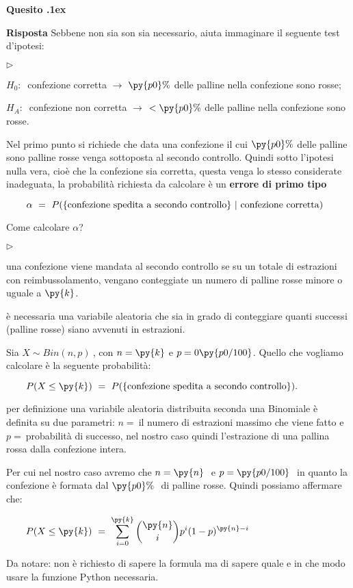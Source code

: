 \documentclass[11pt,twoside,a4paper]{article}
\newcommand{\mylabel}[1]{#1\hfill}
\renewenvironment{itemize}
  {\begin{list}{$\triangleright$}{%
   \setlength{\parskip}{0mm}
   \setlength{\topsep}{.4\baselineskip}
   \setlength{\rightmargin}{0mm}
   \setlength{\listparindent}{0mm}
   \setlength{\itemindent}{0mm}
   \setlength{\labelwidth}{2ex}
   \setlength{\itemsep}{.4\baselineskip}
   \setlength{\parsep}{0mm}
   \setlength{\partopsep}{0mm}
   \setlength{\labelsep}{1ex}
   \setlength{\leftmargin}{\labelwidth+\labelsep}
   \let\makelabel\mylabel}}{%
   \end{list}\vspace*{-1.3mm}}
\newcounter{quesito}
\newenvironment{question}{\addtocounter{quesito}{1}\par\textbf{Quesito \thequesito.\kern1ex}}{\vspace{0.5\parskip}}
\newenvironment{answer}{\par\textbf{Risposta\quad}}{\vspace{\parskip}}
\begin{document}
\begin{question}
\begin{answer}
Sebbene non sia son sia necessario, aiuta immaginare il seguente test d'ipotesi:
\begin{itemize}
\item $H_0:\ $ confezione corretta $\rightarrow$ $\py{p0}\%$ delle palline nella confezione sono rosse;
\item $H_A:\ $ confezione non corretta $\rightarrow$ $< \py{p0}\%$ delle palline nella confezione sono rosse.
\end{itemize} 
Nel primo punto si richiede che data una confezione  il cui $\py{p0} \% $ delle palline sono palline rosse  venga sottoposta al secondo controllo. Quindi sotto l'ipotesi nulla vera, cioè che la confezione sia corretta, questa venga lo stesso considerate inadeguata, la probabilità richiesta da calcolare è un \textbf{errore di primo tipo}

$\qquad
\alpha\ =\ P(\{{\rm confezione\ spedita\ a\ secondo\ controllo}\}\ | {\rm\ confezione\ corretta})
$

Come calcolare $\alpha$? 
\begin{itemize}
\item una confezione viene mandata al secondo controllo se su un totale di  estrazioni con reimbussolamento, vengano conteggiate un numero di palline rosse minore o uguale a $\py{k}$.
\item è necessaria una variabile aleatoria che sia in grado di conteggiare quanti successi (palline rosse) siano avvenuti in  estrazioni.
\item Sia $X\sim Bin(n,p)\ $, con $n=\py{k}$ e $p=0\py{p0/100}$. Quello che vogliamo calcolare è la seguente probabilità:

$\qquad
P(X\le \py{k})\ =\ P(\{\rm confezione\ spedita\ a\ secondo\ controllo\}).
$

\item per definizione una variabile aleatoria distribuita seconda una Binomiale è definita su due parametri: $n=\ $il numero di estrazioni massimo che viene fatto e $p=\ $probabilità di successo, nel nostro caso quindi l'estrazione di una pallina rossa dalla confezione intera. 
\end{itemize}
Per cui nel nostro caso avremo che $n=\py{n}\ $ e $p=\py{p0/100}\ $ in quanto la confezione è formata dal $\py{p0}\%\ $ di palline rosse. Quindi possiamo affermare che:

$\qquad\displaystyle
P(X\le \py{k})\ =\  \sum_{i=0}^{\py{k}}\binom{\py{n}}{i} p^i (1-p)^{\py{n}-i} 
$

Da notare: non è richiesto di sapere la formula ma di sapere quale e in che modo usare la funzione Python necessaria.



\end{answer}
\end{question}
\end{document}
